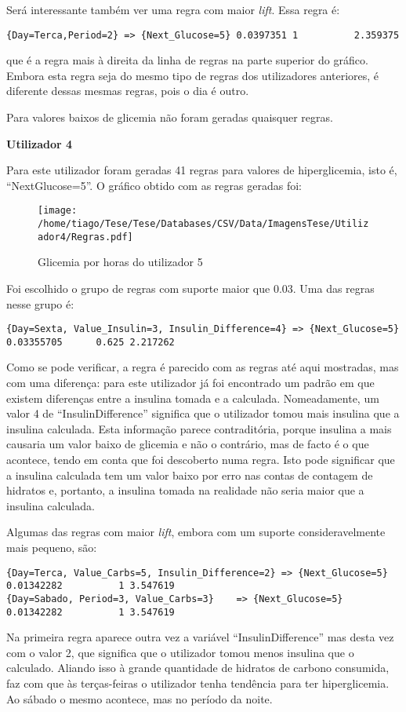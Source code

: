Será interessante também ver uma regra com maior \textit{lift}. Essa regra é:

\begin{lstlisting}
{Day=Terca,Period=2} => {Next_Glucose=5} 0.0397351 1          2.359375
\end{lstlisting}
que é a regra mais à direita da linha de regras na parte superior do gráfico. Embora esta regra seja do mesmo tipo de regras dos utilizadores anteriores, é diferente dessas mesmas regras, pois o dia é outro. 

Para valores baixos de glicemia não foram geradas quaisquer regras.


\textbf{Utilizador 4}

Para este utilizador foram geradas 41 regras para valores de hiperglicemia, isto é, ``Next\textunderscore Glucose=5''. O gráfico obtido com as regras geradas foi:

\begin{figure}[H]
\centering
\texttt{[image: /home/tiago/Tese/Tese/Databases/CSV/Data/ImagensTese/Utilizador4/Regras.pdf]}
\caption{Glicemia por horas do utilizador 5}
\end{figure}
Foi escolhido o grupo de regras com suporte maior que 0.03. Uma das regras nesse grupo é:
 
\begin{lstlisting}
{Day=Sexta, Value_Insulin=3, Insulin_Difference=4} => {Next_Glucose=5} 0.03355705      0.625 2.217262
\end{lstlisting}
Como se pode verificar, a regra é parecido com as regras até aqui mostradas, mas com uma diferença: para este utilizador já foi encontrado um padrão em que existem diferenças entre a insulina tomada e a calculada. Nomeadamente, um valor 4 de ``Insulin\textunderscore Difference'' significa que o utilizador tomou mais insulina que a insulina calculada. Esta informação parece contraditória, porque insulina a mais causaria um valor baixo de glicemia e não o contrário, mas de facto é o que acontece, tendo em conta que foi descoberto numa regra. Isto pode significar que a insulina calculada tem um valor baixo por erro nas contas de contagem de hidratos e, portanto, a insulina tomada na realidade não seria maior que a insulina calculada.

Algumas das regras com maior \textit{lift}, embora com um suporte consideravelmente mais pequeno, são:

\begin{lstlisting}
{Day=Terca, Value_Carbs=5, Insulin_Difference=2} => {Next_Glucose=5} 0.01342282          1 3.547619
{Day=Sabado, Period=3, Value_Carbs=3}    => {Next_Glucose=5} 0.01342282          1 3.547619
\end{lstlisting}
Na primeira regra aparece outra vez a variável ``Insulin\textunderscore Difference'' mas desta vez com o valor 2, que significa que o utilizador tomou menos insulina que o calculado. Aliando isso à grande quantidade de hidratos de carbono consumida, faz com que às terças-feiras o utilizador tenha tendência para ter hiperglicemia. Ao sábado o mesmo acontece, mas no período da noite.


